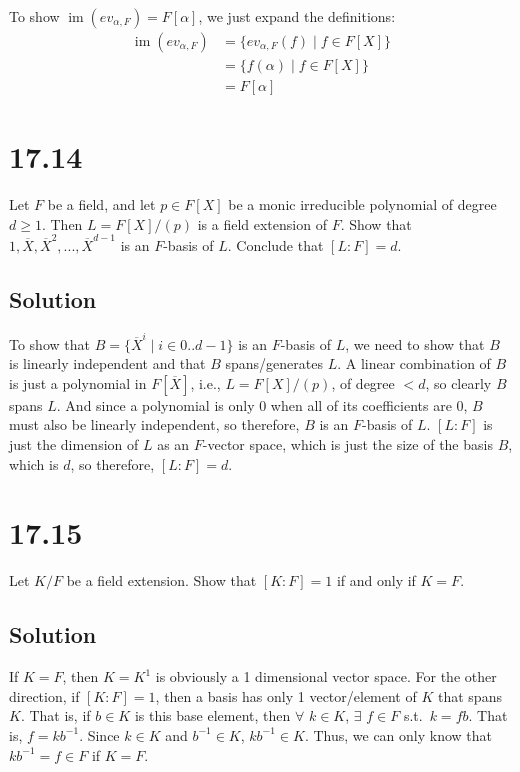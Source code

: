\documentclass[fleqn]{article}
\DeclareMathOperator{\im}{im}
\begin{document}
        To show $\im(ev_{\alpha, F}) = F[\alpha]$, we just expand the definitions:
        \begin{align}
            \im(ev_{\alpha, F}) &= \{ev_{\alpha, F}(f) \mid f \in F[X]\} \\
                &= \{f(\alpha) \mid f \in F[X]\} \\
                &= F[\alpha]
        \end{align}
    
    \section{17.14}
    Let $F$ be a field, and let $p \in F[X]$ be a monic irreducible polynomial of degree $d \geq 1$.  Then $L = F[X]/(p)$ is a field extension of $F$.  Show that $1, \overline{X}, \overline{X}^2, ..., \overline{X}^{d - 1}$ is an $F$-basis of $L$.  Conclude that $[L : F] = d$.
        
        \subsection{Solution}
        To show that $B = \{\overline{X}^i \mid i \in 0..d - 1\}$ is an $F$-basis of $L$, we need to show that $B$ is linearly independent and that $B$ spans/generates $L$.  A linear combination of $B$ is just a polynomial in $F[\overline{X}]$, i.e., $L = F[X]/(p)$, of degree $< d$, so clearly $B$ spans $L$.  And since a polynomial is only 0 when all of its coefficients are 0, $B$ must also be linearly independent, so therefore, $B$ is an $F$-basis of $L$.  $[L : F]$ is just the dimension of $L$ as an $F$-vector space, which is just the size of the basis $B$, which is $d$, so therefore, $[L : F] = d$.
    
    \section{17.15}
    Let $K/F$ be a field extension.  Show that $[K : F] = 1$ if and only if $K = F$.
        
        \subsection{Solution}
        If $K = F$, then $K = K^1$ is obviously a 1 dimensional vector space.  For the other direction, if $[K : F] = 1$, then a basis has only 1 vector/element of $K$ that spans $K$.  That is, if $b \in K$ is this base element, then $\forall$ $k \in K$, $\exists$ $f \in F$ s.t.\ $k = fb$.  That is, $f = kb^{-1}$.  Since $k \in K$ and $b^{-1} \in K$, $kb^{-1} \in K$.  Thus, we can only know that $kb^{-1} = f \in F$ if $K = F$.  
    
\end{document}

